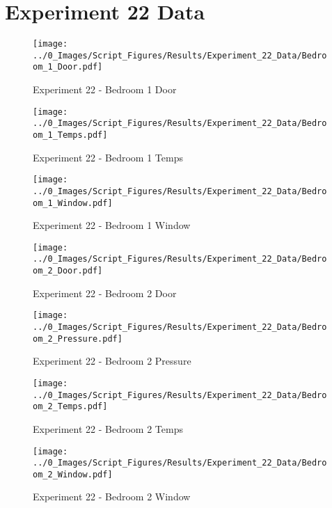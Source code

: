 \clearpage		\large
\section{Experiment 22 Data} \label{App:Exp22Results} 

	\begin{figure}[H]
		\centering
		\texttt{[image: ../0\_Images/Script\_Figures/Results/Experiment\_22\_Data/Bedroom\_1\_Door.pdf]}
		\caption[]{Experiment 22 - Bedroom 1 Door}
	\end{figure}
 

	\begin{figure}[H]
		\centering
		\texttt{[image: ../0\_Images/Script\_Figures/Results/Experiment\_22\_Data/Bedroom\_1\_Temps.pdf]}
		\caption[]{Experiment 22 - Bedroom 1 Temps}
	\end{figure}
 
	\clearpage

	\begin{figure}[H]
		\centering
		\texttt{[image: ../0\_Images/Script\_Figures/Results/Experiment\_22\_Data/Bedroom\_1\_Window.pdf]}
		\caption[]{Experiment 22 - Bedroom 1 Window}
	\end{figure}
 

	\begin{figure}[H]
		\centering
		\texttt{[image: ../0\_Images/Script\_Figures/Results/Experiment\_22\_Data/Bedroom\_2\_Door.pdf]}
		\caption[]{Experiment 22 - Bedroom 2 Door}
	\end{figure}
 
	\clearpage

	\begin{figure}[H]
		\centering
		\texttt{[image: ../0\_Images/Script\_Figures/Results/Experiment\_22\_Data/Bedroom\_2\_Pressure.pdf]}
		\caption[]{Experiment 22 - Bedroom 2 Pressure}
	\end{figure}
 

	\begin{figure}[H]
		\centering
		\texttt{[image: ../0\_Images/Script\_Figures/Results/Experiment\_22\_Data/Bedroom\_2\_Temps.pdf]}
		\caption[]{Experiment 22 - Bedroom 2 Temps}
	\end{figure}
 
	\clearpage

	\begin{figure}[H]
		\centering
		\texttt{[image: ../0\_Images/Script\_Figures/Results/Experiment\_22\_Data/Bedroom\_2\_Window.pdf]}
		\caption[]{Experiment 22 - Bedroom 2 Window}
	\end{figure}
 

